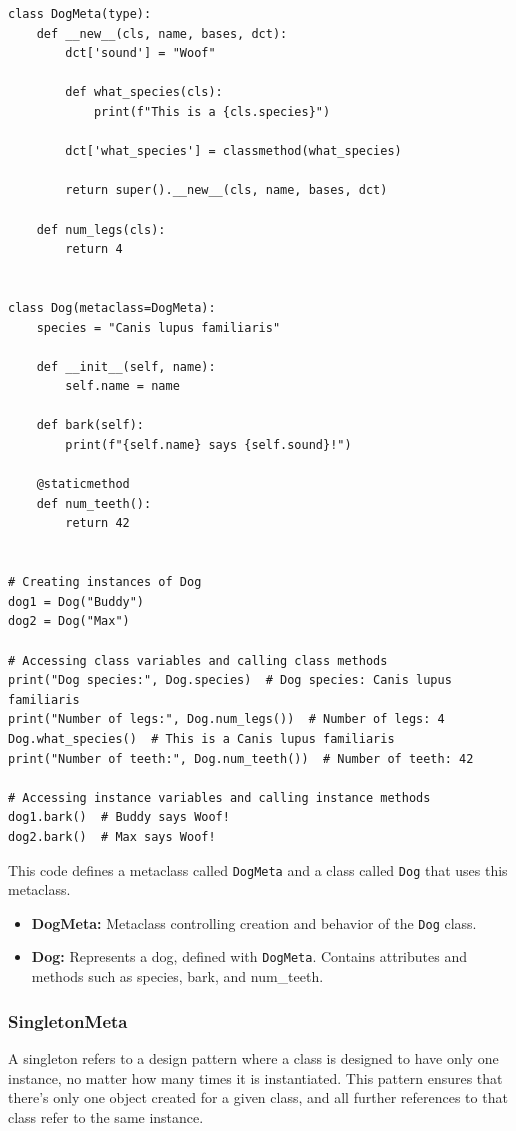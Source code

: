 \begin{codebox}
\begin{verbatim}
class DogMeta(type):
    def __new__(cls, name, bases, dct):
        dct['sound'] = "Woof"

        def what_species(cls):
            print(f"This is a {cls.species}")
        
        dct['what_species'] = classmethod(what_species)

        return super().__new__(cls, name, bases, dct)

    def num_legs(cls):
        return 4


class Dog(metaclass=DogMeta):
    species = "Canis lupus familiaris"

    def __init__(self, name):
        self.name = name

    def bark(self):
        print(f"{self.name} says {self.sound}!")

    @staticmethod
    def num_teeth():
        return 42


# Creating instances of Dog
dog1 = Dog("Buddy")
dog2 = Dog("Max")

# Accessing class variables and calling class methods
print("Dog species:", Dog.species)  # Dog species: Canis lupus familiaris
print("Number of legs:", Dog.num_legs())  # Number of legs: 4
Dog.what_species()  # This is a Canis lupus familiaris
print("Number of teeth:", Dog.num_teeth())  # Number of teeth: 42

# Accessing instance variables and calling instance methods
dog1.bark()  # Buddy says Woof!
dog2.bark()  # Max says Woof!
\end{verbatim}
\end{codebox}

This code defines a metaclass called \texttt{DogMeta} and a class called \texttt{Dog} that uses this metaclass.
\begin{itemize}[]
    \item \textbf{DogMeta:} Metaclass controlling creation and behavior of the \texttt{Dog} class.
    \item \textbf{Dog:} Represents a dog, defined with \texttt{DogMeta}. Contains attributes and methods such as species, bark, and num\_teeth.
\end{itemize}


\newpage
\subsubsection{SingletonMeta}
A singleton refers to a design pattern where a class is designed to have only one instance, no matter how many times it is instantiated. This pattern ensures that there's only one object created for a given class, and all further references to that class refer to the same instance.

